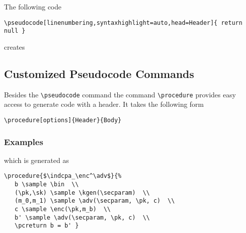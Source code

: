 \documentclass[a4paper]{report}
\begin{document}
The following code 
\begin{lstlisting}
\pseudocode[linenumbering,syntaxhighlight=auto,head=Header]{ return null }
\end{lstlisting}
creates 
\begin{center}
\end{center}

\subsection{Customized Pseudocode Commands}

Besides the  \lstinline{\pseudocode}  command the command  \lstinline{\procedure}
provides easy access to generate code with a header. It takes the following form
\begin{lstlisting}
\procedure[options]{Header}{Body}
\end{lstlisting}

\subsubsection{Examples}
\begin{center}
\end{center}
which is generated as
\begin{lstlisting}
\procedure{$\indcpa_\enc^\adv$}{%
   b \sample \bin  \\
   (\pk,\sk) \sample \kgen(\secparam)  \\
   (m_0,m_1) \sample \adv(\secparam, \pk, c)  \\
   c \sample \enc(\pk,m_b)  \\
   b' \sample \adv(\secparam, \pk, c)  \\
   \pcreturn b = b' }
\end{lstlisting}
\end{document}

